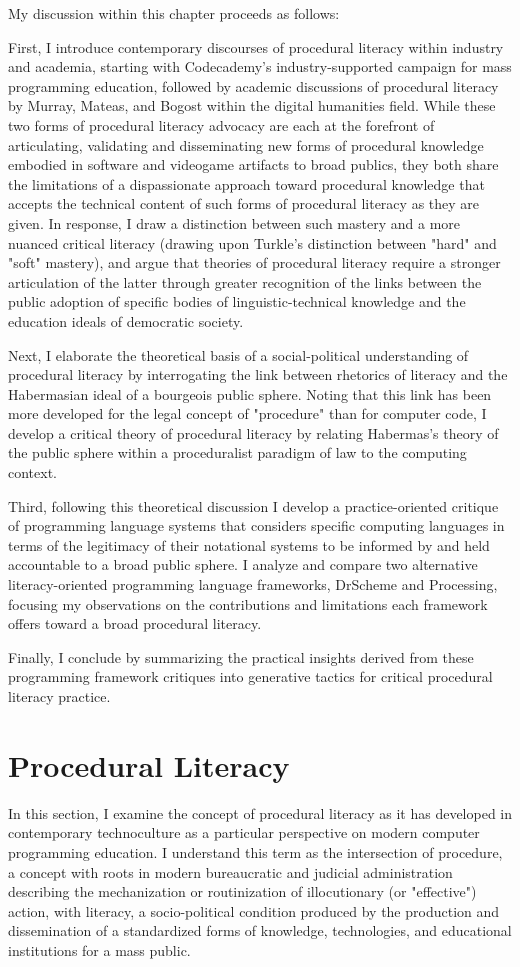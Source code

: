 My discussion within this chapter proceeds as follows:

First, I introduce contemporary discourses of procedural literacy within industry and academia, starting with Codecademy's industry-supported campaign for mass programming education, followed by academic discussions of procedural literacy by Murray, Mateas, and Bogost within the digital humanities field. While these two forms of procedural literacy advocacy are each at the forefront of articulating, validating and disseminating new forms of procedural knowledge embodied in software and videogame artifacts to broad publics, they both share the limitations of a dispassionate approach toward procedural knowledge that accepts the technical content of such forms of procedural literacy as they are given. In response, I draw a distinction between such mastery and a more nuanced critical literacy (drawing upon Turkle's distinction between "hard" and "soft" mastery), and argue that theories of procedural literacy require a stronger articulation of the latter through greater recognition of the links between the public adoption of specific bodies of linguistic-technical knowledge and the education ideals of democratic society.

Next, I elaborate the theoretical basis of a social-political understanding of procedural literacy by interrogating the link between rhetorics of literacy and the Habermasian ideal of a bourgeois public sphere. Noting that this link has been more developed for the legal concept of "procedure" than for computer code, I develop a critical theory of procedural literacy by relating Habermas's theory of the public sphere within a proceduralist paradigm of law to the computing context.

Third, following this theoretical discussion I develop a practice-oriented critique of programming language systems that considers specific computing languages in terms of the legitimacy of their notational systems to be informed by and held accountable to a broad public sphere. I analyze and compare two alternative literacy-oriented programming language frameworks, DrScheme and Processing, focusing my observations on the contributions and limitations each framework offers toward a broad procedural literacy.

Finally, I conclude by summarizing the practical insights derived from these programming framework critiques into generative tactics for critical procedural literacy practice.

\section{Procedural Literacy}
In this section, I examine the concept of procedural literacy as it has developed in contemporary technoculture as a particular perspective on modern computer programming education. I understand this term as the intersection of procedure, a concept with roots in modern bureaucratic and judicial administration describing the mechanization or routinization of illocutionary (or "effective") action, with literacy, a socio-political condition produced by the production and dissemination of a standardized forms of knowledge, technologies, and educational institutions for a mass public.

